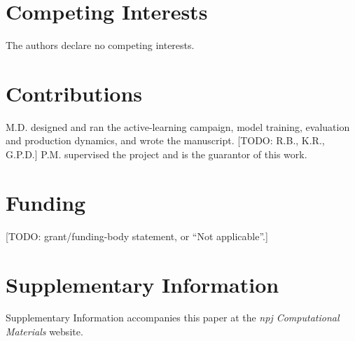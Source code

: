 \documentclass[11pt]{article}
\begin{document}
\section*{Competing Interests}
The authors declare no competing interests.

\section*{Contributions}
M.D. designed and ran the active-learning campaign, model training, evaluation
and production dynamics, and wrote the manuscript. [TODO: R.B., K.R., G.P.D.]
P.M. supervised the project and is the guarantor of this work.

\section*{Funding}
[TODO: grant/funding-body statement, or ``Not applicable''.]

\section*{Supplementary Information}
Supplementary Information accompanies this paper at the \emph{npj
Computational Materials} website.
\end{document}
